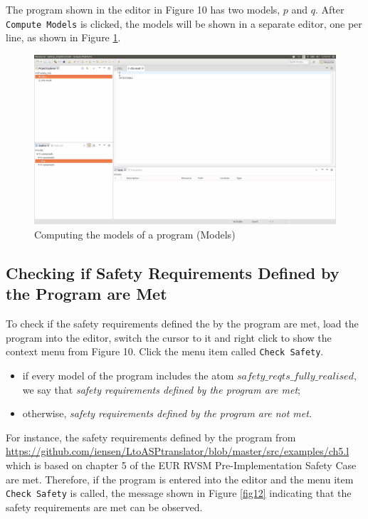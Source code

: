 \documentclass[a4paper,10pt]{article}
\begin{document}
The program shown in the editor in Figure 10 has two models, $p$ and $q$. After   \texttt{Compute Models} is clicked, the models will be shown in a separate editor, one per line, as shown in Figure \ref{fig11}.


\begin{figure}[H]
\centering
\includegraphics[width=1.0\textwidth]{11}
\caption{Computing the models of a program (Models)}\label{fig11}
\end{figure}



\subsection{Checking if Safety Requirements Defined by the Program are Met}  

To check if the safety requirements defined the by the program are met, load the program into the editor, switch the cursor to it and right click to show the context menu from Figure 10. Click  the menu item called \texttt{Check Safety}.
\begin{itemize}
\item if every model of the program includes the atom $safety\_reqts\_fully\_realised$, 
we say that \textit{safety requirements defined by the program are met};
\item otherwise, \textit{safety requirements defined by the program are not met.}
\end{itemize}

\noindent
For instance, the safety requirements defined by the program from
\url{https://github.com/iensen/LtoASPtranslator/blob/master/src/examples/ch5.l}\\ which
is based on chapter 5 of the EUR RVSM Pre-Implementation Safety Case
\cite{rvsm} are met. Therefore, if the program is entered into the editor
and the menu item \texttt{Check Safety} is called, the message shown
in Figure \ref{fig12} indicating that the safety requirements are met
can be observed.
\end{document}
